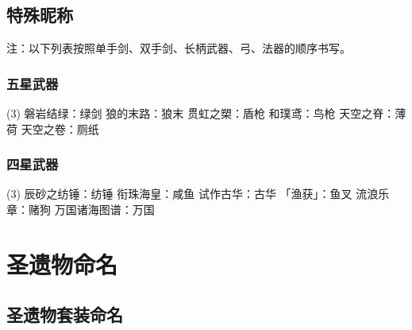 \subsection{特殊昵称}

注：以下列表按照单手剑、双手剑、长柄武器、弓、法器的顺序书写。

\subsubsection{五星武器}

\begin{tasks}(3)
	\task 磐岩结绿：绿剑
	\task 狼的末路：狼末
	\task 贯虹之槊：盾枪
	\task 和璞鸢：鸟枪
	\task 天空之脊：薄荷
	\task 天空之卷：厕纸
\end{tasks}

\subsubsection{四星武器}

\begin{tasks}(3)
	\task 辰砂之纺锤：纺锤
	\task 衔珠海皇：咸鱼
	\task 试作古华：古华
	\task 「渔获」：鱼叉
	\task 流浪乐章：赌狗
	\task 万国诸海图谱：万国
\end{tasks}




\section{圣遗物命名}

\subsection{圣遗物套装命名}

